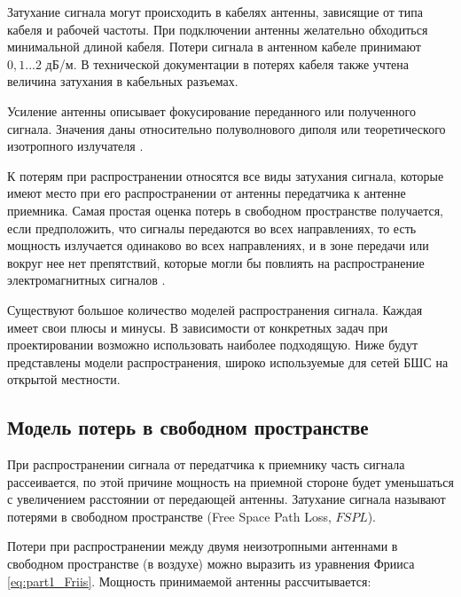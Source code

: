 

Затухание сигнала могут происходить в кабелях антенны, зависящие от типа кабеля и рабочей частоты. При подключении антенны желательно обходиться минимальной длиной кабеля. Потери сигнала в антенном кабеле принимают $0, 1...2$ дБ/м. В технической документации в потерях кабеля также учтена величина затухания в кабельных разъемах. 

Усиление антенны описывает фокусирование переданного или полученного сигнала. Значения даны относительно полуволнового диполя или теоретического изотропного излучателя \cite{Gost62657}.


К потерям при распространении относятся все виды затухания сигнала, которые имеют место при его распространении от антенны передатчика к антенне приемника. Самая простая оценка потерь в свободном пространстве получается, если предположить, что сигналы передаются во всех направлениях, то есть мощность излучается одинаково во всех направлениях, и в зоне передачи или вокруг нее нет препятствий, которые могли бы повлиять на распространение электромагнитных сигналов \cite{Krouk2010}. 


Существуют большое количество моделей распространения сигнала. Каждая имеет свои плюсы и минусы. В зависимости от конкретных задач при проектировании возможно использовать наиболее подходящую. Ниже будут представлены модели распространения, широко используемые для сетей БШС на открытой местности.  

\subsection{Модель потерь в свободном пространстве}
При распространении сигнала от передатчика к приемнику часть сигнала рассеивается, по этой причине мощность на приемной стороне будет уменьшаться с увеличением  расстоянии от передающей антенны. Затухание сигнала называют потерями в свободном пространстве (Free Space Path Loss, $FSPL$).

Потери при распространении между двумя неизотропными антеннами в свободном пространстве (в воздухе) можно выразить из уравнения Фрииса \cref{eq:part1_Friis}. Мощность принимаемой антенны рассчитывается:

